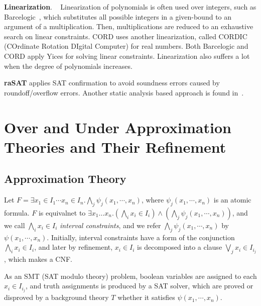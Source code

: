 \documentclass[runningheads,a4paper,oribibl]{llncs}
\newcommand{\mizuhito}[1]{\{{\bf Mizuhito:~\sf #1}\}} %
\begin{document}
\medskip \noindent
\textbf{Linearization}. ~
Linearization of polynomials is often used over integers, such as Barcelogic~\cite{barce}, 
which substitutes all possible integers in a given-bound to an argument of a multiplication. 
Then, multiplications are reduced to an exhaustive search on linear constraints. 
CORD \cite{cord} uses another linearization, called 
CORDIC (COrdinate Rotation DIgital Computer) for real numbers. 
Both Barcelogic and CORD apply Yices for solving linear constraints.
Linearization also suffers a lot when the degree of polynomials increases. 

\medskip 
{\bf raSAT} applies SAT confirmation to avoid soundness errors caused by roundoff/overflow errors. 
Another static analysis based approach is found in~\cite{SilvaTACAS12}. 



\section{Over and Under Approximation Theories and Their Refinement}
\label{sec:raSATloop} 
\subsection{Approximation Theory}

Let 
$F = \exists x_1 \in I_1 \cdots x_n \in I_n. \bigwedge \limits_j \psi_j(x_1,\cdots,x_n)$, 
where $\psi_j(x_1,\cdots,x_n)$ is an atomic formula. 
%
$F$ is equivalnet to 
$\exists x_1 \ldots x_n. (\bigwedge \limits_i x_i \in I_i) \wedge (\bigwedge \limits_j \psi_j(x_1,\cdots,x_n))$, 
and we call $\bigwedge \limits_i x_i \in I_i$ {\em interval constraints}, and 
we refer $\bigwedge \limits_j \psi_j(x_1,\cdots,x_n)$ by $\psi(x_1,\cdots,x_n)$. 
Initially, interval constraints have a form of the conjunction $\bigwedge \limits_i x_i \in I_i$, 
and later by refinement, $x_i \in I_i$ is decomposed into a clause $\bigvee_j x_i \in I_{i_j}$, 
which makes a CNF. 

As an SMT (SAT modulo theory) problem, 
boolean variables are assigned to each $x_i \in I_{i_j}$, 
and truth assignments is produced by a SAT solver, 
which are proved or disproved by a background theory $T$ whether it satisfies $\psi(x_1,\cdots,x_n)$. 
\end{document}
